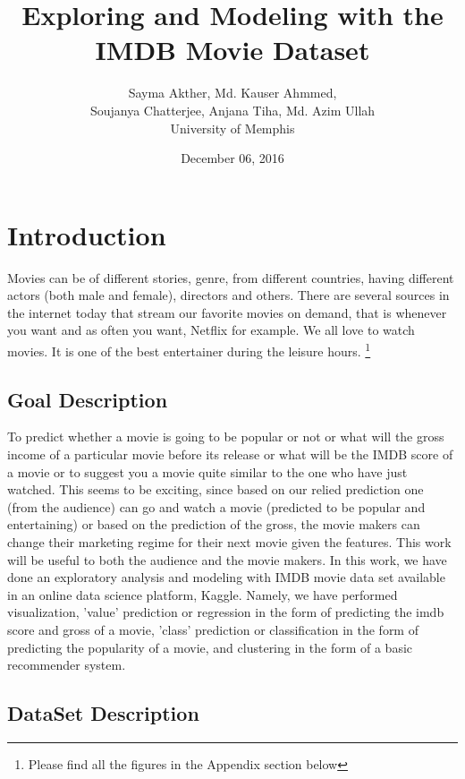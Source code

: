 \documentclass{article}%
\begin{document}
\title{Exploring and Modeling with the IMDB Movie Dataset}
\author{Sayma Akther, Md. Kauser Ahmmed, 
\\Soujanya Chatterjee, Anjana Tiha, Md. Azim Ullah
\\University of Memphis}
\date{December 06, 2016}
\maketitle

\section{Introduction}

Movies can be of different stories, genre, from different countries, having different actors (both male and female), directors and others. There are several sources in the internet today that stream our favorite movies on demand, that is whenever you want and as often you want, Netflix for example. We all love to watch movies. It is one of the best entertainer during the leisure hours. \footnote{Please find all the figures in the Appendix section below}

\subsection{Goal Description}

To predict whether a movie is going to be popular or not or what will the gross income of a particular movie before its release or what will be the IMDB score of a movie or to suggest you a movie quite similar to the one who have just watched. This seems to be exciting, since based on our relied prediction one (from the audience) can go and watch a movie (predicted to be popular and entertaining) or based on the prediction of the gross, the movie makers can change their marketing regime for their next movie given the features. This work will be useful to both the audience and the movie makers. 
In this work, we have done an exploratory analysis and modeling with IMDB movie data set available in an online data science platform, Kaggle. Namely, we have performed visualization, 'value' prediction or regression in the form of predicting the imdb score and gross of a movie, 'class' prediction or classification in the form of predicting the popularity of a movie, and clustering in the form of a basic recommender system.

\subsection{DataSet Description}
\end{document}
